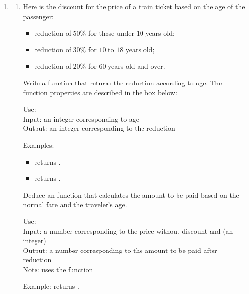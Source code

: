 \documentclass[11pt,class=report,crop=false]{standalone}
\begin{document}
\begin{activite}


\begin{enumerate}
  \item 
  
  \begin{enumerate}
  \item 
  Here is the discount for the price of a train ticket based on the age of the passenger:
  \begin{itemize}
    \item reduction of $50\%$ for those under $10$ years old;
    \item reduction of $30\%$ for $10$ to $18$ years old;
    \item reduction of $20\%$ for $60$ years old and over.
  \end{itemize}
  
  Write a function  that returns the reduction according to age. The function properties are described in the box below:
\begin{fonction}[\ci{reduction()}]
  Use:  \\
  Input: an integer corresponding to age \\
  Output: an integer corresponding to the reduction
  
  \medskip
    
  Examples: 
  \begin{itemize}
    \item {} returns .
    \item {} returns .
  \end{itemize}
  \end{fonction}  
  
  Deduce an  function that calculates the amount to be paid based on the normal fare and the traveler's age.
  
\begin{fonction}[\ci{amount()}]
  Use: \\
  Input: a number  corresponding to the price without discount and  (an integer)\\
  Output: a number corresponding to the amount to be paid after reduction\\
  Note: uses the function 
  \medskip
    
  Example:  returns .
  \end{fonction} 
  

\end{enumerate}
\end{enumerate}
\end{activite}
\end{document}
